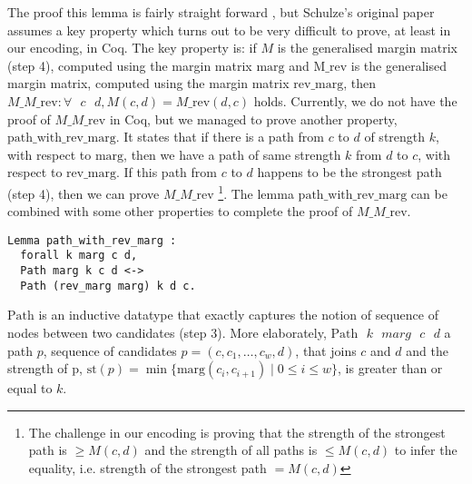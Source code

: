 \documentclass[compsoc,conference,a4paper,10pt,times]{IEEEtran}
\begin{document}
\noindent
The proof this lemma is fairly straight forward \cite{Schulze:2011:NMC}, but 
Schulze's original paper assumes a key property which turns out to be very difficult to prove, 
at least in our encoding, in Coq. The key property is: if $M$ 
is the generalised margin 
matrix (step 4), computed using the margin matrix $\mathrm{marg}$
and $\mathrm{M\_rev}$ is the generalised 
margin matrix, computed using the margin matrix $\mathrm{rev\_marg}$, then 
$M\_M\_\mathrm{rev}: \forall \text{ } c \text{ } d,  M(c, d) =
M\_\mathrm{rev} (d, c)$ holds. Currently, 
we do not have the proof of $M\_M\_\mathrm{rev}$ in Coq, but we managed to prove 
another property, $\mathrm{path\_with\_rev\_marg}$.  
It states that if there is a path from 
$c$ to $d$ of strength $k$, with respect to $\mathrm{marg}$, then we have 
a path of same strength $k$ from $d$ to $c$, with respect to
$\mathrm{rev\_marg}$. 
If this path from $c$ to $d$ happens to be the strongest path (step 4), 
then we can prove $M\_M\_\mathrm{rev}$ \footnote{The challenge in our encoding 
is proving that the strength of the strongest path is $\geq  M(c, d)$ and 
the strength of all paths is $\leq M(c, d)$ to infer the equality, 
i.e. strength of the strongest path $= M(c, d)$}.  The lemma $\mathrm{path\_with\_rev\_marg}$ can be 
combined with 
some other properties to complete the proof of $M\_M\_\mathrm{rev}$. 

\begin{verbatim}
Lemma path_with_rev_marg :
  forall k marg c d,
  Path marg k c d <->  
  Path (rev_marg marg) k d c.

\end{verbatim}

\noindent
$\mathrm{Path}$ is an inductive datatype that exactly captures the notion of 
sequence of nodes between two candidates (step 3). More elaborately, 
$\mathrm{Path} \text{ }k \text{ }marg \text{ }c \text{ }d$ a path $p$, sequence of candidates 
$p= (c,c_{1}, \dots ,c_{w},d)$, that joins $c$ and $d$ and the strength of 
p, $\mathrm{st}(p) =  \min \lbrace \mathrm{marg} (c_i, c_{i+1}) \mid 0 
\leq i \leq w \rbrace$, is greater than or equal to $k$. 






\end{document}
